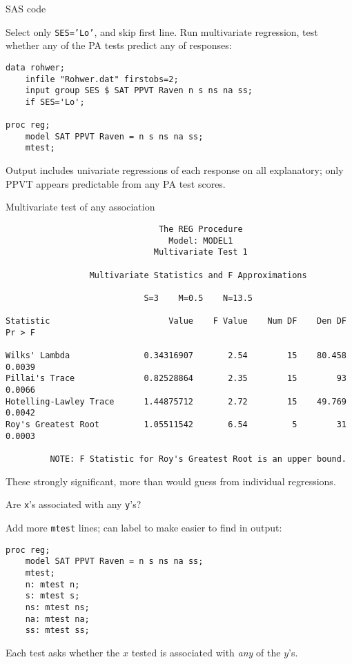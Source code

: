 \begin{frame}[fragile]{SAS code}

Select only \texttt{SES='Lo'}, and skip first line. Run multivariate
regression, test whether any of the PA tests predict any of responses:

\begin{verbatim}
data rohwer;
    infile "Rohwer.dat" firstobs=2;
    input group SES $ SAT PPVT Raven n s ns na ss;
    if SES='Lo';

proc reg;
    model SAT PPVT Raven = n s ns na ss;
    mtest;
\end{verbatim}

Output includes univariate regressions of each response on all
explanatory; only PPVT appears predictable from any PA test scores.
  
\end{frame}

\begin{frame}[fragile]{Multivariate test of any association}

  {\scriptsize
\begin{verbatim}
                               The REG Procedure
                                 Model: MODEL1
                              Multivariate Test 1

                 Multivariate Statistics and F Approximations
 
                            S=3    M=0.5    N=13.5
 
Statistic                        Value    F Value    Num DF    Den DF    Pr > F

Wilks' Lambda               0.34316907       2.54        15    80.458    0.0039
Pillai's Trace              0.82528864       2.35        15        93    0.0066
Hotelling-Lawley Trace      1.44875712       2.72        15    49.769    0.0042
Roy's Greatest Root         1.05511542       6.54         5        31    0.0003

         NOTE: F Statistic for Roy's Greatest Root is an upper bound.
\end{verbatim}
}

These strongly significant, more than would guess from individual
regressions.

\end{frame}

\begin{frame}[fragile]{Are \texttt{x}'s associated with any
    \texttt{y}'s?}

Add more \texttt{mtest} lines; can label to make easier to find in
output:

\begin{verbatim}
proc reg;
    model SAT PPVT Raven = n s ns na ss;
    mtest;
    n: mtest n;
    s: mtest s;
    ns: mtest ns;
    na: mtest na;
    ss: mtest ss;
\end{verbatim}

Each test asks whether the $x$ tested is associated with \emph{any} of
the $y$'s.


  
\end{frame}


